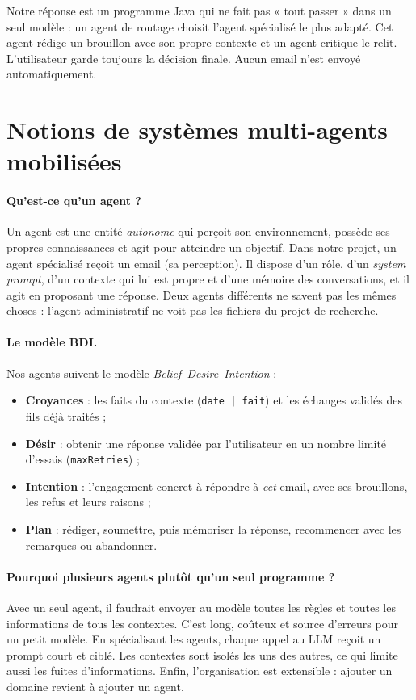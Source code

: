 \documentclass[11pt,a4paper]{article}
\newcommand{\code}[1]{\texttt{#1}}
\begin{document}
Notre réponse est un programme Java qui ne fait pas « tout passer » dans un seul modèle :
un agent de routage choisit l'agent spécialisé le plus adapté. Cet agent rédige un
brouillon avec son propre contexte et un agent critique le relit. L'utilisateur garde
toujours la décision finale. Aucun email n'est envoyé automatiquement.

\section{Notions de systèmes multi-agents mobilisées}

\paragraph{Qu'est-ce qu'un agent ?}
Un agent est une entité \emph{autonome} qui perçoit son environnement, possède ses propres
connaissances et agit pour atteindre un objectif. Dans notre projet, un agent spécialisé
reçoit un email (sa perception). Il dispose d'un rôle, d'un \emph{system prompt}, d'un
contexte qui lui est propre et d'une mémoire des conversations, et il agit en proposant
une réponse. Deux agents différents ne savent pas les mêmes choses : l'agent
administratif ne voit pas les fichiers du projet de recherche.

\paragraph{Le modèle BDI.}
Nos agents suivent le modèle \emph{Belief--Desire--Intention} :
\begin{itemize}
  \item \textbf{Croyances} : les faits du contexte (\code{date | fait}) et les échanges validés des fils déjà traités ;
  \item \textbf{Désir} : obtenir une réponse validée par l'utilisateur en un nombre limité d'essais (\code{maxRetries}) ;
  \item \textbf{Intention} : l'engagement concret à répondre à \emph{cet} email, avec ses brouillons, les refus et leurs raisons ;
  \item \textbf{Plan} : rédiger, soumettre, puis mémoriser la réponse, recommencer avec les remarques ou abandonner.
\end{itemize}

\paragraph{Pourquoi plusieurs agents plutôt qu'un seul programme ?}
Avec un seul agent, il faudrait envoyer au modèle toutes les règles et toutes les
informations de tous les contextes. C'est long, coûteux et source d'erreurs pour un petit
modèle. En spécialisant les agents, chaque appel au LLM reçoit un prompt court et ciblé.
Les contextes sont isolés les uns des autres, ce qui limite aussi les fuites
d'informations. Enfin, l'organisation est extensible : ajouter un domaine revient à
ajouter un agent.
\end{document}
